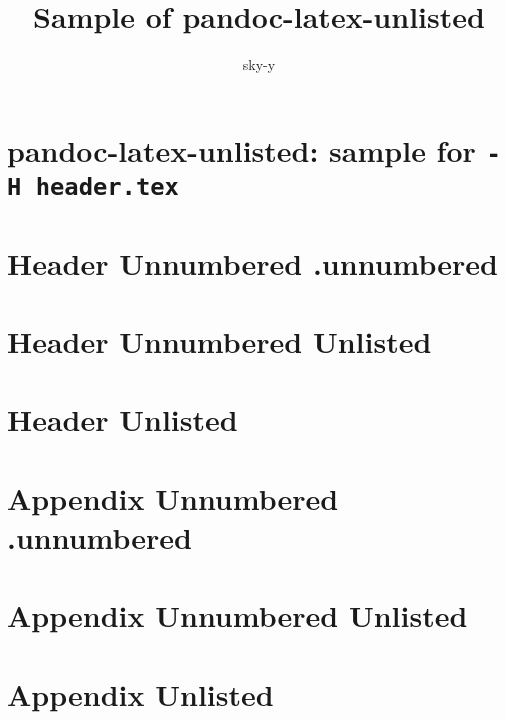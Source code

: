 \documentclass[]{book}
\title{Sample of pandoc-latex-unlisted}
\author{sky-y}
\date{}
\begin{document}
\maketitle

{
\setcounter{tocdepth}{2}
\tableofcontents
}
\chapter{\texorpdfstring{pandoc-latex-unlisted: sample for
\texttt{-H\ header.tex}}{pandoc-latex-unlisted: sample for -H header.tex}}

\chapter{Header Unnumbered .unnumbered}

\renewcommand{\addcontentsline}[3]{}

\chapter*{Header Unnumbered Unlisted}
\addcontentsline{toc}{chapter}{Header Unnumbered Unlisted}

\renewcommand{\addcontentsline}[3]{\oldaddcontentsline{#1}{#2}{#3}}

\renewcommand{\addcontentsline}[3]{}

\chapter{Header Unlisted}

\renewcommand{\addcontentsline}[3]{\oldaddcontentsline{#1}{#2}{#3}}

\appendix

\chapter{Appendix Unnumbered .unnumbered}

\renewcommand{\addcontentsline}[3]{}

\chapter*{Appendix Unnumbered Unlisted}
\addcontentsline{toc}{chapter}{Appendix Unnumbered Unlisted}

\renewcommand{\addcontentsline}[3]{\oldaddcontentsline{#1}{#2}{#3}}

\renewcommand{\addcontentsline}[3]{}

\chapter{Appendix Unlisted}

\renewcommand{\addcontentsline}[3]{\oldaddcontentsline{#1}{#2}{#3}}
\end{document}
